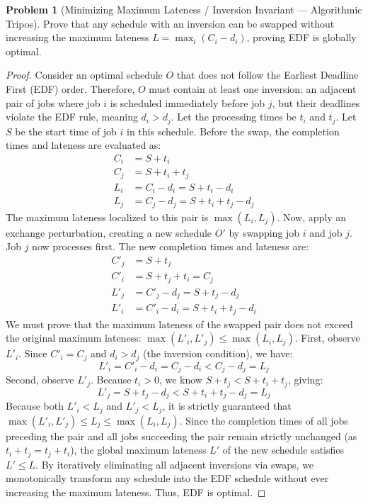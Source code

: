 \documentclass[11pt, a4paper]{article}
\theoremstyle{definition}
\newtheorem{problem}{Problem}
\theoremstyle{plain}
\begin{document}
\vspace{0.5cm}

\begin{problem}[Minimizing Maximum Lateness / Inversion Invariant --- Algorithmic Tripos]
Prove that any schedule with an inversion can be swapped without increasing the maximum lateness $L = \max_i (C_i - d_i)$, proving EDF is globally optimal.
\end{problem}

\begin{proof}
Consider an optimal schedule $O$ that does not follow the Earliest Deadline First (EDF) order. Therefore, $O$ must contain at least one inversion: an adjacent pair of jobs where job $i$ is scheduled immediately before job $j$, but their deadlines violate the EDF rule, meaning $d_i > d_j$.
Let the processing times be $t_i$ and $t_j$. Let $S$ be the start time of job $i$ in this schedule. 
Before the swap, the completion times and lateness are evaluated as:
\begin{align*}
C_i &= S + t_i \\
C_j &= S + t_i + t_j \\
L_i &= C_i - d_i = S + t_i - d_i \\
L_j &= C_j - d_j = S + t_i + t_j - d_j
\end{align*}
The maximum lateness localized to this pair is $\max(L_i, L_j)$.
Now, apply an exchange perturbation, creating a new schedule $O'$ by swapping job $i$ and job $j$. Job $j$ now processes first. The new completion times and lateness are:
\begin{align*}
C'_j &= S + t_j \\
C'_i &= S + t_j + t_i = C_j \\
L'_j &= C'_j - d_j = S + t_j - d_j \\
L'_i &= C'_i - d_i = S + t_i + t_j - d_i
\end{align*}
We must prove that the maximum lateness of the swapped pair does not exceed the original maximum lateness: $\max(L'_i, L'_j) \le \max(L_i, L_j)$.
First, observe $L'_i$. Since $C'_i = C_j$ and $d_i > d_j$ (the inversion condition), we have:
\[
L'_i = C'_i - d_i = C_j - d_i < C_j - d_j = L_j
\]
Second, observe $L'_j$. Because $t_i > 0$, we know $S + t_j < S + t_i + t_j$, giving:
\[
L'_j = S + t_j - d_j < S + t_i + t_j - d_j = L_j
\]
Because both $L'_i < L_j$ and $L'_j < L_j$, it is strictly guaranteed that $\max(L'_i, L'_j) \le L_j \le \max(L_i, L_j)$.
Since the completion times of all jobs preceding the pair and all jobs succeeding the pair remain strictly unchanged (as $t_i + t_j = t_j + t_i$), the global maximum lateness $L'$ of the new schedule satisfies $L' \le L$.
By iteratively eliminating all adjacent inversions via swaps, we monotonically transform any schedule into the EDF schedule without ever increasing the maximum lateness. Thus, EDF is optimal.
\end{proof}
\end{document}
